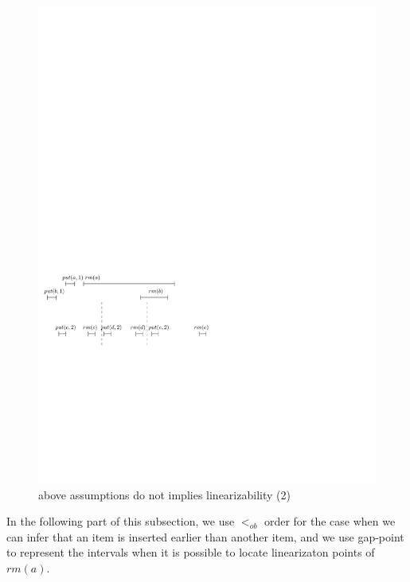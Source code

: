 \documentclass{llncs}
\begin{document}
\begin{figure}[htbp]
  \centering
  \includegraphics[width=0.6 \textwidth]{PIC-HIS-INTRO-OB-ORDER2.pdf}
  \caption{above assumptions do not implies linearizability (2)}
  \label{fig:history introduct ob order2}
\end{figure}

In the following part of this subsection, we use $<_{\textit{ob}}$ order for the case when we can infer that an item is inserted earlier than another item, and we use gap-point to represent the intervals when it is possible to locate linearizaton points of $\textit{rm}(a)$.
\end{document}
